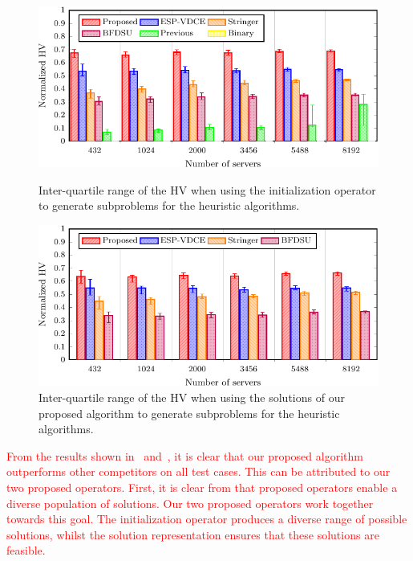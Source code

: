 \begin{figure}
    \centering
    \hfill
    \begin{minipage}[t]{.48\textwidth}
        \centering
        \includegraphics[width=\columnwidth]{graphs/comparison/comparison-crop}
        \caption{Inter-quartile range of the HV when using the initialization operator to generate subproblems for the heuristic algorithms.}
        \label{fig:alg_comparison}
    \end{minipage}\hfill
    \begin{minipage}[t]{.48\textwidth}
        \centering
        \includegraphics[width=\columnwidth]{graphs/comparison/alg_fixed-crop}
        \caption{Inter-quartile range of the HV when using the solutions of our proposed algorithm to generate subproblems for the heuristic algorithms.}
        \label{fig:alg_fixed}
    \end{minipage}
    \hfill
\end{figure}

\textcolor{red}{
From the results shown in~ and~, it is clear that our proposed algorithm outperforms other competitors on all test cases. This can be attributed to our two proposed operators. First, it is clear from  that proposed operators enable a diverse population of solutions. Our two proposed operators work together towards this goal. The initialization operator produces a diverse range of possible solutions, whilst the solution representation ensures that these solutions are feasible.
}


